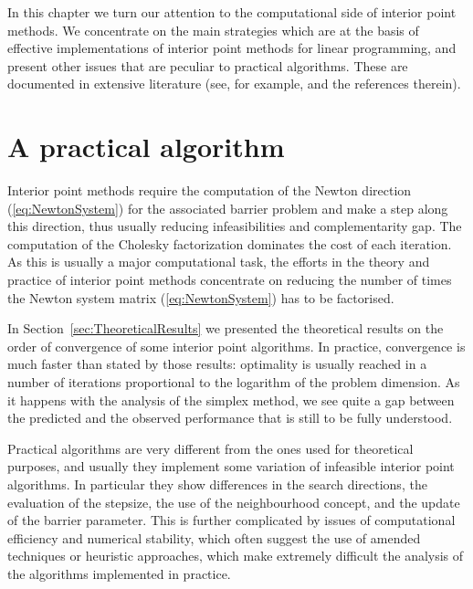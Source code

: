 
%
%
\label{ch:PracticalIpm}

In this chapter we turn our attention to the computational side of
interior point methods. We concentrate on the main strategies which are
at the basis of effective implementations of interior point methods
for linear programming, and present other issues that are peculiar 
to practical algorithms.
These are documented in extensive literature (see, for example, 
\cite{AndersenGondzioMeszarosXu,GondzioTerlaky} and the references therein).


%
%
\section{A practical algorithm}

Interior point methods require the computation of the Newton 
direction (\ref{eq:NewtonSystem})
for the associated barrier problem and make a step along 
this direction, thus usually reducing infeasibilities 
and complementarity gap.
The computation of the Cholesky factorization
dominates the cost of each iteration.
As this is usually a major computational task, 
the efforts in the theory and practice of 
interior point methods concentrate on reducing 
the number of times the Newton system matrix (\ref{eq:NewtonSystem}) 
has to be factorised.

In Section~\ref{sec:TheoreticalResults} we presented the theoretical
results on the order of convergence of some interior point algorithms.
In practice, convergence is much faster than stated by those results:
optimality is usually reached in a number of iterations 
proportional to the logarithm of the problem dimension. 
As it happens with the analysis of the simplex method, we see quite
a gap between the predicted and the observed performance that is still to
be fully understood.


Practical algorithms are very different from the ones used for
theoretical purposes, and usually they implement some variation
of infeasible interior point algorithms. In particular they show
differences in the search directions, the evaluation of the stepsize, 
the use of the neighbourhood concept, and the update of the
barrier parameter.
This is further complicated by issues of computational efficiency
and numerical stability, which often suggest the use of amended
techniques or heuristic approaches, which make extremely difficult 
the analysis of the algorithms implemented in practice.

